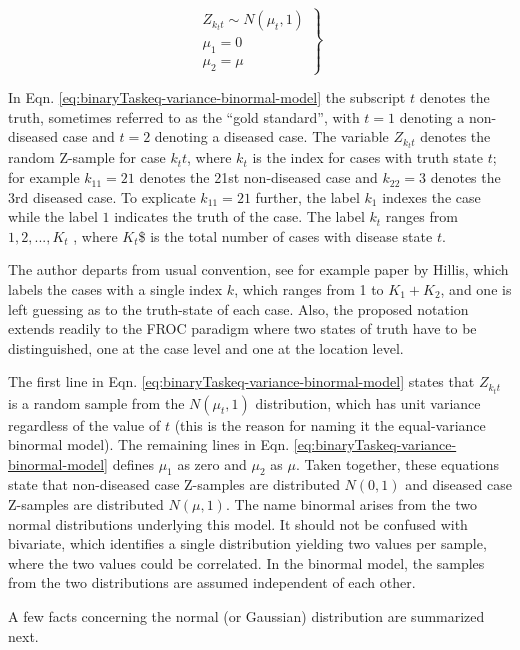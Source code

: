 \documentclass[
]{book}
\begin{document}
\begin{equation} 
\left.\begin{matrix}
Z_{k_tt} \sim N(\mu_t,1) \\ 
\mu_1=0\\ 
\mu_2=\mu
\end{matrix}\right\}
\label{eq:binaryTaskeq-variance-binormal-model}
\end{equation}

In Eqn. \eqref{eq:binaryTaskeq-variance-binormal-model} the subscript \(t\) denotes the truth, sometimes referred to as the ``gold standard'', with \(t = 1\) denoting a non-diseased case and \(t = 2\) denoting a diseased case. The variable \(Z_{k_tt}\) denotes the random Z-sample for case \(k_tt\), where \(k_t\) is the index for cases with truth state \(t\); for example \(k_11=21\) denotes the 21st non-diseased case and \(k_22=3\) denotes the 3rd diseased case. To explicate \(k_11=21\) further, the label \(k_1\) indexes the case while the label \(1\) indicates the truth of the case. The label \(k_t\) ranges from \(1,2,...,K_t\) , where \(K_t\)\$ is the total number of cases with disease state \(t\).

The author departs from usual convention, see for example paper by Hillis, which labels the cases with a single index \(k\), which ranges from 1 to \(K_1+K_2\), and one is left guessing as to the truth-state of each case. Also, the proposed notation extends readily to the FROC paradigm where two states of truth have to be distinguished, one at the case level and one at the location level.

The first line in Eqn. \eqref{eq:binaryTaskeq-variance-binormal-model} states that \(Z_{k_tt}\) is a random sample from the \(N(\mu_t,1)\) distribution, which has unit variance regardless of the value of \(t\) (this is the reason for naming it the equal-variance binormal model). The remaining lines in Eqn. \eqref{eq:binaryTaskeq-variance-binormal-model} defines \(\mu_1\) as zero and \(\mu_2\) as \(\mu\). Taken together, these equations state that non-diseased case Z-samples are distributed \(N(0,1)\) and diseased case Z-samples are distributed \(N(\mu,1)\). The name binormal arises from the two normal distributions underlying this model. It should not be confused with bivariate, which identifies a single distribution yielding two values per sample, where the two values could be correlated. In the binormal model, the samples from the two distributions are assumed independent of each other.

A few facts concerning the normal (or Gaussian) distribution are summarized next.
\end{document}
